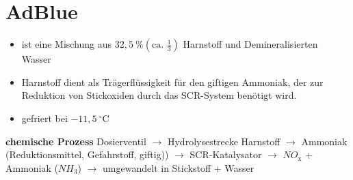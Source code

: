 \section{AdBlue}\label{adblue}

\begin{itemize}
\item
  ist eine Mischung aus $32,5~\% (\text{ca. } \frac{1}{3})$ Harnstoff
  und Demineralisierten Wasser
\item
  Harnstoff dient als Trägerflüssigkeit für den giftigen Ammoniak, der
  zur Reduktion von Stickoxiden durch das SCR-System benötigt wird.
\item
  gefriert bei $- 11,5~^\circ\text{C}$
\end{itemize}

\textbf{chemische Prozess} Dosierventil $\to$ Hydrolysestrecke
Harnstoff $\to$ Ammoniak (Reduktionsmittel, Gefahrstoff, giftig))
$\to$ SCR-Katalysator $\to$ $NO_\text{x}$ + Ammoniak
($NH_\text{3}$) $\to$ umgewandelt in Stickstoff + Wasser

